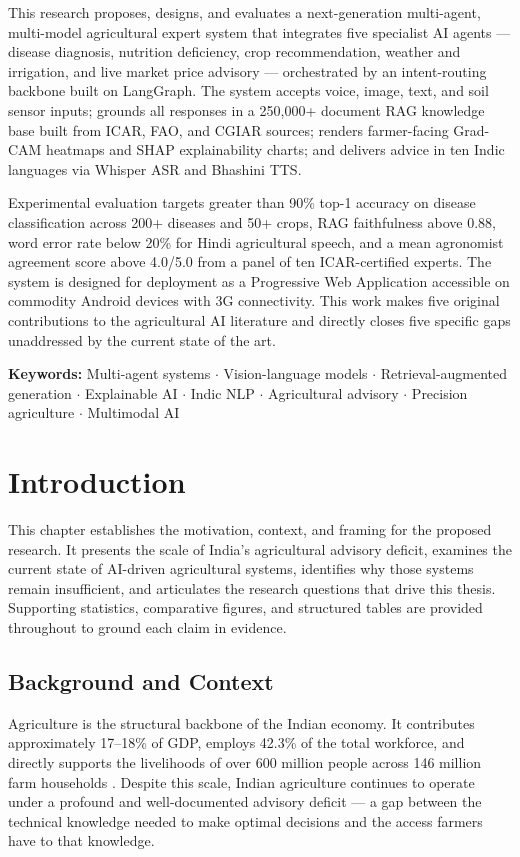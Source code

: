 \documentclass[12pt,a4paper]{article}
\begin{document}
This research proposes, designs, and evaluates a next-generation multi-agent, multi-model agricultural expert system that integrates five specialist AI agents --- disease diagnosis, nutrition deficiency, crop recommendation, weather and irrigation, and live market price advisory --- orchestrated by an intent-routing backbone built on LangGraph. The system accepts voice, image, text, and soil sensor inputs; grounds all responses in a 250,000+ document RAG knowledge base built from ICAR, FAO, and CGIAR sources; renders farmer-facing Grad-CAM heatmaps and SHAP explainability charts; and delivers advice in ten Indic languages via Whisper ASR and Bhashini TTS.

Experimental evaluation targets greater than 90\% top-1 accuracy on disease classification across 200+ diseases and 50+ crops, RAG faithfulness above 0.88, word error rate below 20\% for Hindi agricultural speech, and a mean agronomist agreement score above 4.0/5.0 from a panel of ten ICAR-certified experts. The system is designed for deployment as a Progressive Web Application accessible on commodity Android devices with 3G connectivity. This work makes five original contributions to the agricultural AI literature and directly closes five specific gaps unaddressed by the current state of the art.

\vspace{0.3cm}
\noindent\textbf{Keywords:} Multi-agent systems $\cdot$ Vision-language models $\cdot$ Retrieval-augmented generation $\cdot$ Explainable AI $\cdot$ Indic NLP $\cdot$ Agricultural advisory $\cdot$ Precision agriculture $\cdot$ Multimodal AI

\clearpage
\tableofcontents
\newpage
\listoffigures
\clearpage
\section{Introduction}

This chapter establishes the motivation, context, and framing for the proposed research. It presents the scale of India's agricultural advisory deficit, examines the current state of AI-driven agricultural systems, identifies why those systems remain insufficient, and articulates the research questions that drive this thesis. Supporting statistics, comparative figures, and structured tables are provided throughout to ground each claim in evidence.

\subsection{Background and Context}
Agriculture is the structural backbone of the Indian economy. It contributes approximately 17--18\% of GDP, employs 42.3\% of the total workforce, and directly supports the livelihoods of over 600 million people across 146 million farm households \cite{census2021}. Despite this scale, Indian agriculture continues to operate under a profound and well-documented advisory deficit --- a gap between the technical knowledge needed to make optimal decisions and the access farmers have to that knowledge.
\end{document}
